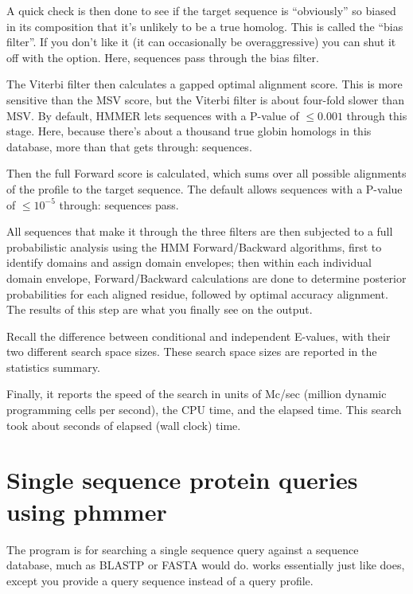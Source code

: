 A quick check is then done to see if the target sequence is
``obviously'' so biased in its composition that it's unlikely to be a
true homolog. This is called the ``bias filter''. If you don't like it
(it can occasionally be overaggressive) you can shut it off with the
 option. Here, \SGUbiaspass{} sequences pass through the bias
filter.

The Viterbi filter then calculates a gapped optimal alignment score.
This is more sensitive than the MSV score, but the Viterbi filter is
about four-fold slower than MSV. By default, HMMER lets sequences
with a P-value of $\leq 0.001$ through this stage. Here, because
there's about a thousand true globin homologs in this database, more
than that gets through: \SGUvitpass{} sequences.

Then the full Forward score is calculated, which sums over all
possible alignments of the profile to the target sequence. The default
allows sequences with a P-value of $\leq 10^{-5}$ through: \SGUfwdpass{}
sequences pass.

All sequences that make it through the three filters are then
subjected to a full probabilistic analysis using the HMM
Forward/Backward algorithms, first to identify domains and assign
domain envelopes; then within each individual domain envelope,
Forward/Backward calculations are done to determine posterior
probabilities for each aligned residue, followed by optimal accuracy
alignment. The results of this step are what you finally see on the
output.

Recall the difference between conditional and independent E-values,
with their two different search space sizes. These search space sizes
are reported in the statistics summary.

Finally, it reports the speed of the search in units of Mc/sec
(million dynamic programming cells per second), the CPU time, and the
elapsed time. This search took about \SGUelapsed{} seconds of elapsed
(wall clock) time.



\section{Single sequence protein queries using phmmer}

The  program is for searching a single sequence query
against a sequence database, much as BLASTP or FASTA would
do.  works essentially just like  does,
except you provide a query sequence instead of a query profile.

